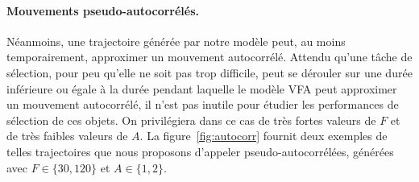     \paragraph{Mouvements pseudo-autocorrélés.}
    \label{sub:pseudoAutoCorr}
	Néanmoins, une trajectoire générée par notre modèle peut, au moins temporairement, approximer un mouvement autocorrélé. Attendu qu'une tâche de sélection, pour peu qu'elle ne soit pas trop difficile, peut se dérouler sur une durée inférieure ou égale à la durée pendant laquelle le modèle VFA peut approximer un mouvement autocorrélé, il n'est pas inutile pour étudier les performances de sélection de ces objets. On privilégiera dans ce cas de très fortes valeurs de $F$ et de très faibles valeurs de $A$. La figure~\ref{fig:autocorr} fournit deux exemples de telles trajectoires que nous proposons d'appeler pseudo-autocorrélées, générées avec $F \in \{30,120\}$ et $A \in \{1,2\}$.
	
